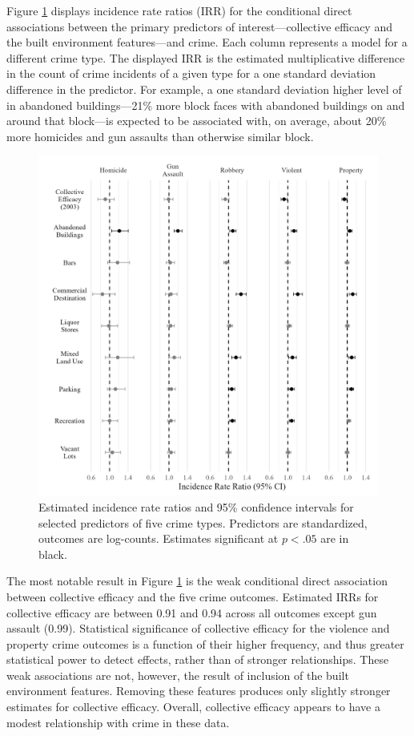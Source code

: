 \documentclass [11pt, proquest] {uwthesis}[2015/03/03]
\begin{document}
Figure \ref{fig:coefplot} displays incidence rate ratios (IRR) for the conditional direct associations between the primary predictors of interest---collective efficacy and the built environment features---and crime. Each column represents a model for a different crime type. The displayed IRR is the estimated multiplicative difference in the count of crime incidents of a given type for a one standard deviation difference in the predictor. For example, a one standard deviation higher level of in abandoned buildings---21\% more block faces with abandoned buildings on and around that block---is expected to be associated with, on average, about 20\% more homicides and gun assaults than otherwise similar block.
\begin{figure}

{\centering \includegraphics[width=1\linewidth]{./figure/ch2/coefplot_stage_2} 

}

\caption{Estimated incidence rate ratios and 95\% confidence intervals for selected predictors of five crime types. Predictors are standardized, outcomes are log-counts. Estimates significant at $p < .05$ are in black.}\label{fig:coefplot}
\end{figure}
The most notable result in Figure \ref{fig:coefplot} is the weak conditional direct association between collective efficacy and the five crime outcomes. Estimated IRRs for collective efficacy are between 0.91 and 0.94 across all outcomes except gun assault (0.99). Statistical significance of collective efficacy for the violence and property crime outcomes is a function of their higher frequency, and thus greater statistical power to detect effects, rather than of stronger relationships. These weak associations are not, however, the result of inclusion of the built environment features. Removing these features produces only slightly stronger estimates for collective efficacy. Overall, collective efficacy appears to have a modest relationship with crime in these data.
\end{document}
